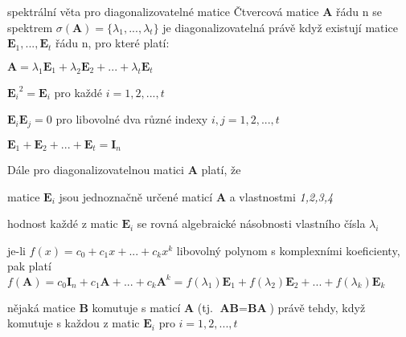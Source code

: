\begin{vetaN}{spektrální věta pro diagonalizovatelné matice}
Čtvercová matice \textbf{A} řádu n se spektrem $\sigma(\textbf{A}) = \{\lambda_1,...,\lambda_t\}$ je diagonalizovatelná právě když existují matice $\textbf{E}_1,...,\textbf{E}_t$ řádu n, pro které platí:
\begin{penumerate}
  \item $\textbf{A} = \lambda_1 \textbf{E}_1 + \lambda_2 \textbf{E}_2 + ... + \lambda_t \textbf{E}_t$
  \item ${\textbf{E}_i}^2 = \textbf{E}_i$ pro každé $i = 1,2,...,t$
  \item $\textbf{E}_i \textbf{E}_j = 0$ pro libovolné dva různé indexy $i,j = 1,2,...,t$
  \item $\textbf{E}_1 + \textbf{E}_2 + ... + \textbf{E}_t = \textbf{I}_n$

  \bigskip
  Dále pro diagonalizovatelnou matici \textbf{A} platí, že
  \item matice $\textbf{E}_i$ jsou jednoznačně určené maticí \textbf{A} a vlastnostmi \textit{1,2,3,4}
  \item hodnost každé z matic $\textbf{E}_i$ se rovná algebraické násobnosti vlastního čísla $\lambda_i$
  \item je-li $f(x)= c_0 + c_1 x + ... + c_k x^k$ libovolný polynom s komplexními koeficienty, pak platí $f(\textbf{A})= c_0 \textbf{I}_n + c_1 \textbf{A} + ... + c_k \textbf{A}^k = f(\lambda_1)\textbf{E}_1 + f(\lambda_2)\textbf{E}_2 + ... + f(\lambda_k)\textbf{E}_k$
  \item nějaká matice \textbf{B} komutuje s maticí \textbf{A} (tj. $\textbf{AB}=\textbf{BA}$) právě tehdy, když komutuje s každou z matic $\textbf{E}_i$ pro $i = 1,2,...,t$
\end{penumerate}
\end{vetaN}

